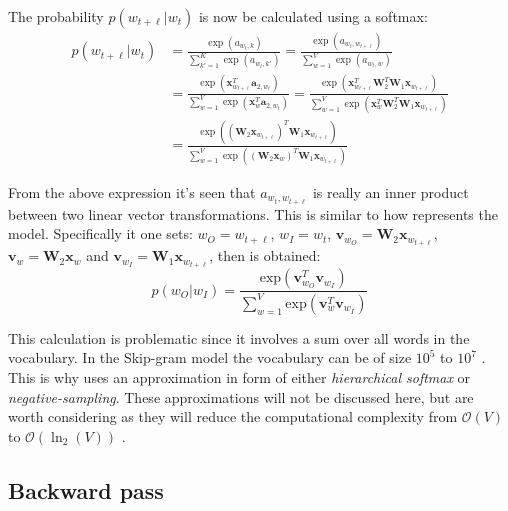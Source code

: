 The probability $p(w_{t + \ell} | w_t)$ is now be calculated using a softmax:
\begin{equation}
\begin{aligned}
p(w_{t + \ell} | w_t)
&= \frac{\exp(a_{w_t,k})}{\sum_{k'=1}^K \exp(a_{w_t,k'})}
= \frac{\exp(a_{w_t, w_{t + \ell}})}{\sum_{w=1}^V \exp(a_{w_t, w})} \\
&= \frac{\exp( \mathbf{x}_{w_{t+\ell}}^T \mathbf{a}_{2,w_t} )}{\sum_{w=1}^V \exp(\mathbf{x}_{w}^T \mathbf{a}_{2,w_t})}
= \frac{
	\exp( \mathbf{x}_{w_{t+\ell}}^T \mathbf{W}_2^T \mathbf{W}_1 \mathbf{x}_{w_{t+\ell}})
}{
	\sum_{w=1}^V \exp(\mathbf{x}_{w}^T \mathbf{W}_2^T \mathbf{W}_1 \mathbf{x}_{w_{t+\ell}})
} \\
&= \frac{
	\exp( \left(\mathbf{W}_2 \mathbf{x}_{w_{t+\ell}} \right)^T \mathbf{W}_1 \mathbf{x}_{w_{t+\ell}})
}{
	\sum_{w=1}^V \exp( \left(\mathbf{W}_2 \mathbf{x}_{w}\right)^T \mathbf{W}_1 \mathbf{x}_{w_{t+\ell}})
}
\end{aligned}
\end{equation}

From the above expression it's seen that $a_{w_t, w_{t + \ell}}$ is really an inner product between two linear vector transformations. This is similar to how \cite{word2vec-details} represents the model. Specifically it one sets: $w_O = w_{t + \ell}$, $w_I = w_t$, $\mathbf{v}_{w_O} = \mathbf{W}_2 \mathbf{x}_{w_{t+\ell}}$, $\mathbf{v}_{w} = \mathbf{W}_2 \mathbf{x}_{w}$ and $\mathbf{v}_{w_I} = \mathbf{W}_1 \mathbf{x}_{w_{t + \ell}}$, then \cite[eq. 2]{word2vec-details} is obtained:
\begin{equation}
p(w_O | w_I) = \frac{
	\mathrm{exp}( \mathbf{v}_{w_O}^T \mathbf{v}_{w_I} )
}{
	\sum_{w=1}^V \mathrm{exp}( \mathbf{v}_{w}^T \mathbf{v}_{w_I} )
}
\end{equation}

This calculation is problematic since it involves a sum over all words in the vocabulary. In the Skip-gram model the vocabulary can be of size $10^5$ to $10^7$ \cite{word2vec-details}. This is why \cite{word2vec-comparing, word2vec-details, word2vec-explained} uses an approximation in form of either \textit{hierarchical softmax} or \textit{negative-sampling}. These approximations will not be discussed here, but are worth considering as they will reduce the computational complexity from $\mathcal{O}(V)$ to $\mathcal{O}(\ln_2(V))$ \cite{word2vec-comparing}.

\subsection{Backward pass}


